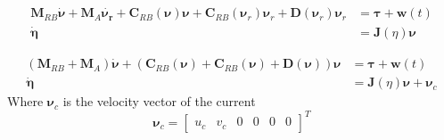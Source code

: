 \documentclass[12pt,a4]{article}
\begin{document}
\begin{align}
	\bm{M}_{RB}\bm{\dot{\nu}} + \bm{M}_{A}\bm{\dot{\nu_r}} + \bm{C}_{RB}(\bm{\nu})\bm{\nu} + \bm{C}_{RB}(\bm{\nu}_r)\bm{\nu}_r + \bm{D}(\bm{\nu}_r)\bm{\nu}_r & = \bm{\tau} + \bm{w}(t) \\
	\bm{\dot{\eta}}                                                                                                                                           & = \bm{J}(\eta)\bm{\nu}
\end{align}

\begin{align}
	\left(\bm{M}_{RB} + \bm{M}_{A}  \right) \bm{\dot{\nu}} + \left(\bm{C}_{RB}(\bm{\nu}) + \bm{C}_{RB}(\bm{\nu}) + \bm{D}(\bm{\nu})  \right)\bm{\nu} & = \bm{\tau} + \bm{w}(t)             \\
	\bm{\dot{\eta}}                                                                                                                                  & = \bm{J}(\eta)\bm{\nu} + \bm{\nu}_c
\end{align}
Where $\bm{\nu}_c$ is the velocity vector of the current
\begin{equation}
	\bm{\nu}_c =  \begin{bmatrix}u_c & v_c & 0 & 0 & 0 & 0 \end{bmatrix}^T
\end{equation}
\end{document}
